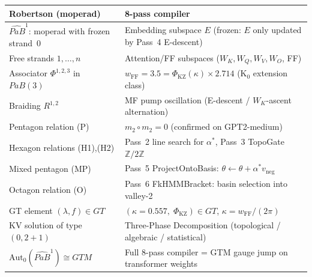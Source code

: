 \documentclass[11pt]{amsart}
\begin{document}
\begin{center}\small
\begin{tabular}{p{4.5cm}p{7cm}}
\toprule
\textbf{Robertson (moperad)} & \textbf{8-pass compiler} \\
\midrule
$\widehat{PaB}^1$: moperad with frozen strand~$0$
  & Embedding subspace $E$ (frozen: $E$ only updated by Pass~4 E-descent) \\
Free strands $1,\ldots,n$
  & Attention/FF subspaces ($W_K, W_Q, W_V, W_O$, FF) \\
Associator $\Phi^{1,2,3}$ in $PaB(3)$
  & $w_\mathrm{FF} = 3.5 = \Phi_\mathrm{KZ}(\kappa)\times 2.714$
    (K$_0$ extension class) \\
Braiding $R^{1,2}$
  & MF pump oscillation (E-descent / $W_K$-ascent alternation) \\
Pentagon relation (P)
  & $m_2\circ m_2 = 0$ (confirmed on GPT2-medium) \\
Hexagon relations (H1),(H2)
  & Pass~2 line search for $\alpha^*$, Pass~3 TopoGate $\mathbb{Z}/2\mathbb{Z}$ \\
Mixed pentagon (MP)
  & Pass~5 ProjectOntoBasis: $\theta\leftarrow\theta + \alpha^* v_\mathrm{neg}$ \\
Octagon relation (O)
  & Pass~6 FkHMMBracket: basin selection into valley-2 \\
GT element $(\lambda, f)\in GT$
  & $(\kappa=0.557,\; \Phi_\mathrm{KZ})\in GT$, $\kappa = w_\mathrm{FF}/(2\pi)$ \\
KV solution of type $(0,2{+}1)$
  & Three-Phase Decomposition (topological / algebraic / statistical) \\
$\mathrm{Aut}_0(\widehat{PaB}^1)\cong GTM$
  & Full 8-pass compiler = GTM gauge jump on transformer weights \\
\bottomrule
\end{tabular}
\end{center}
\end{document}
